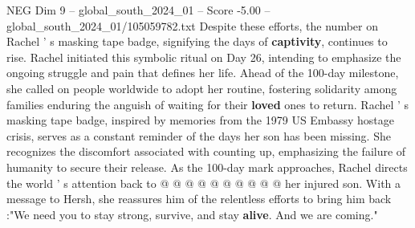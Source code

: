 \begin{textsample}{NEG Dim 9 – global\_south\_2024\_01 – Score -5.00 – global\_south\_2024\_01/105059782.txt}
Despite these efforts, the number on Rachel ' s masking tape badge, signifying the days of \textbf{captivity}, continues to rise.
Rachel initiated this symbolic ritual on Day 26, intending to emphasize the ongoing struggle and pain that defines her life.
Ahead of the 100-day milestone, she called on people worldwide to adopt her routine, fostering solidarity among families enduring the anguish of waiting for their \textbf{loved} ones to return.
Rachel ' s masking tape badge, inspired by memories from the 1979 US Embassy hostage crisis, serves as a constant reminder of the days her son has been missing.
She recognizes the discomfort associated with counting up, emphasizing the failure of humanity to secure their release.
As the 100-day mark approaches, Rachel directs the world ' s attention back to @ @ @ @ @ @ @ @ @ @ her injured son.
With a message to Hersh, she reassures him of the relentless efforts to bring him back :"We need you to stay strong, survive, and stay \textbf{alive}.
And we are coming."

\end{textsample}
